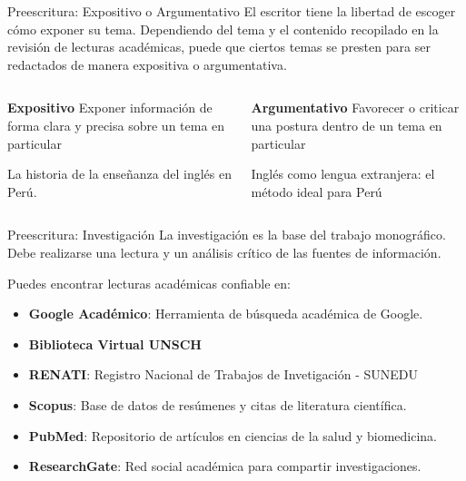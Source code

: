 \documentclass[
11pt, %
]{beamer}
\begin{document}
\begin{frame}{Preescritura: Expositivo o Argumentativo}
	El escritor tiene la libertad de escoger cómo exponer su tema.
	Dependiendo del tema y el contenido recopilado en la revisión de lecturas
	académicas, puede que ciertos temas se presten para ser redactados de manera
	expositiva o argumentativa.

	\vspace{0.5cm}

	\begin{columns}[c]
		\begin{column}{0.45\textwidth}
			\textbf{Expositivo}
			Exponer información de forma clara y
			precisa sobre un tema en particular
			\begin{block}{}
				La historia de la enseñanza del inglés en Perú.
			\end{block}
		\end{column}
		\begin{column}{0.5\textwidth}
			\textbf{Argumentativo}
			Favorecer o criticar una postura dentro de un tema en particular
			\begin{block}{}
				Inglés como lengua extranjera: el método ideal para Perú
			\end{block}
		\end{column}
	\end{columns}
\end{frame}

\begin{frame}{Preescritura: Investigación}
	La investigación es la base del trabajo monográfico. Debe
	realizarse una lectura y un análisis crítico de las fuentes de
	información.

	\vspace{0.5cm}

	Puedes encontrar lecturas académicas confiable en:
	\begin{itemize}
		\item \textbf{Google Académico}: Herramienta de búsqueda académica de Google.
		\item \textbf{Biblioteca Virtual UNSCH}
		\item \textbf{RENATI}: Registro Nacional de Trabajos de Invetigación - 	SUNEDU
		\item \textbf{Scopus}: Base de datos de resúmenes y citas de literatura científica.
		\item \textbf{PubMed}: Repositorio de artículos en ciencias de la salud y biomedicina.
		\item \textbf{ResearchGate}: Red social académica para compartir investigaciones.
	\end{itemize}
\end{frame}
\end{document}
